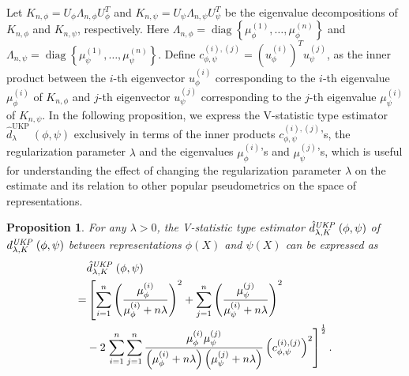 \documentclass{article}
\theoremstyle{plain}
\newcounter{propositionno}
\newtheorem{proposition}[propositionno]{Proposition}
\newcommand{\repone}{\phi}
\newcommand{\reptwo}{\psi}
\newcommand{\metricstname}{UKP }
\begin{document}
Let $K_{n,\repone} = U_{\repone} \Lambda_{n,\repone}U_{\repone}^{T}$ and $K_{n,\reptwo} = U_{\reptwo} \Lambda_{n,\reptwo}U_{\reptwo}^{T}$ be the eigenvalue decompositions of $K_{n,\repone}$ and 
$K_{n,\reptwo}$, respectively. Here $\Lambda_{n,\repone} = \operatorname{diag}\left\{\mu_{\repone}^{(1)},\dots,\mu_{\repone}^{(n)}\right\}$ and $\Lambda_{n,\reptwo} = \operatorname{diag}\left\{\mu_{\reptwo}^{(1)},\dots,\mu_{\reptwo}^{(n)}\right\}$. Define $c_{\repone,\reptwo}^{(i),(j)} = \left(u_{\repone}^{(i)}\right)^{T}u_{\reptwo}^{(j)}$, as the inner product between the $i$-th eigenvector $u_{\repone}^{(i)}$ corresponding to the $i$-th eigenvalue $\mu_{\repone}^{(i)}$ of $K_{n,\repone}$ and $j$-th eigenvector $u_{\reptwo}^{(j)}$ corresponding to the $j$-th eigenvalue $\mu_{\reptwo}^{(i)}$  of $K_{n,\reptwo}$. In the following proposition, we express the V-statistic type estimator $\hat{d}_{\lambda}^{\text{\metricstname}}(\repone,\reptwo)$ exclusively in terms of the inner products $c_{\repone,\reptwo}^{(i),(j)}$'s, the regularization parameter $\lambda$ and the eigenvalues $\mu_{\repone}^{(i)}$'s and $\mu_{\reptwo}^{(j)}$'s, which is useful for understanding the effect of changing the regularization parameter $\lambda$ on the estimate and its relation to other popular pseudometrics on the space of representations.

\begin{proposition}\label{Proposition: Estimator in terms of eigenvalues and eigenvectors of Gram matrices}
    For any $\lambda>0$, the V-statistic type estimator $\hat{d}_{\lambda,K}^{\emph{\metricstname}}(\repone,\reptwo)$ of $d_{\lambda,K}^{\emph{\metricstname}}(\repone,\reptwo)$ between representations $\repone(X)$ and $\reptwo(X)$ can be expressed as
    \[
    \begin{aligned}
        &\hat{d}_{\lambda,K}^{\emph{\metricstname}}(\repone,\reptwo)\\
        =& \left[\sum_{i=1}^{n} \left(\frac{\mu_{\repone}^{(i)}}{\mu_{\repone}^{(i)}+ n\lambda}\right)^{2} + \sum_{j=1}^{n} \left(\frac{\mu_{\reptwo}^{(j)}}{\mu_{\reptwo}^{(i)}+ n\lambda}\right)^{2}\right.\\
        &-2\left.\sum_{i=1}^{n}\sum_{j=1}^{n}\frac{\mu_{\repone}^{(i)}\mu_{\reptwo}^{(j)}}{\left(\mu_{\repone}^{(i)} + n\lambda\right)\left(\mu_{\reptwo}^{(j)} + n\lambda\right)}\left(c_{\repone,\reptwo}^{(i),(j)} \right)^{2}\right]^{\frac{1}{2}}.
    \end{aligned}
    \]
\end{proposition}
\end{document}
